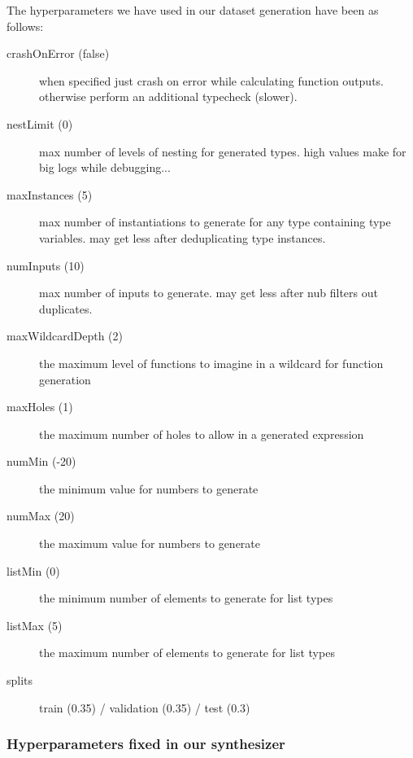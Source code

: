 \documentclass{article}
\begin{document}
The hyperparameters we have used in our dataset generation have been as follows:
\begin{description}
    \item[crashOnError (false)] when specified just crash on error while calculating function outputs. otherwise perform an additional typecheck (slower).
    \item[nestLimit (0)] max number of levels of nesting for generated types. high values make for big logs while debugging...
    \item[maxInstances (5)] max number of instantiations to generate for any type containing type variables. may get less after deduplicating type instances.
    \item[numInputs (10)] max number of inputs to generate. may get less after nub filters out duplicates.
    \item[maxWildcardDepth (2)] the maximum level of functions to imagine in a wildcard for function generation
    \item[maxHoles (1)] the maximum number of holes to allow in a generated expression
    \item[numMin (-20)] the minimum value for numbers to generate
    \item[numMax (20)] the maximum value for numbers to generate
    \item[listMin (0)] the minimum number of elements to generate for list types
    \item[listMax (5)] the maximum number of elements to generate for list types
    \item[splits] train (0.35) / validation (0.35) / test (0.3)
\end{description}

\subsubsection{Hyperparameters fixed in our synthesizer}
\end{document}

